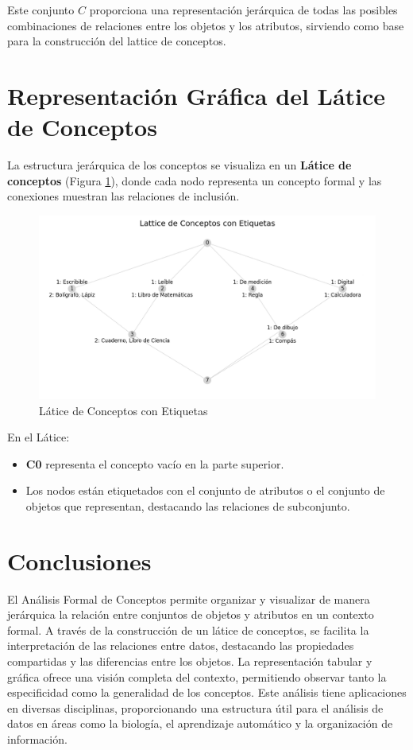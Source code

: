   Este conjunto \( C \) proporciona una representación jerárquica de todas las posibles combinaciones de relaciones entre los objetos y los atributos, sirviendo como base para la construcción del lattice de conceptos.

  
\section{Representación Gráfica del Látice de Conceptos}

La estructura jerárquica de los conceptos se visualiza en un \textbf{Látice de conceptos} (Figura \ref{fig:lattice_view}), donde cada nodo representa un concepto formal y las conexiones muestran las relaciones de inclusión.

\begin{figure}[H]
  \centering
  \includegraphics[width=\textwidth]{Figures/1. Content/lattice_view.png}
  \caption{Látice de Conceptos con Etiquetas}
  \label{fig:lattice_view}
\end{figure}

En el Látice:
\begin{itemize}
    \item \textbf{C0} representa el concepto vacío en la parte superior.
    \item Los nodos están etiquetados con el conjunto de atributos o el conjunto de objetos que representan, destacando las relaciones de subconjunto.
\end{itemize}

\section{Conclusiones}

El Análisis Formal de Conceptos permite organizar y visualizar de manera jerárquica la relación entre conjuntos de objetos y atributos en un contexto formal. A través de la construcción de un látice de conceptos, se facilita la interpretación de las relaciones entre datos, destacando las propiedades compartidas y las diferencias entre los objetos. La representación tabular y gráfica ofrece una visión completa del contexto, permitiendo observar tanto la especificidad como la generalidad de los conceptos. Este análisis tiene aplicaciones en diversas disciplinas, proporcionando una estructura útil para el análisis de datos en áreas como la biología, el aprendizaje automático y la organización de información.
